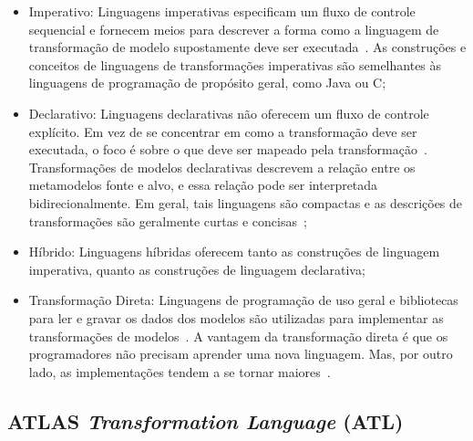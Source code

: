 \begin{itemize}
	\item Imperativo: Linguagens imperativas especificam um fluxo de controle sequencial e fornecem meios para descrever a forma como a linguagem de transformação de modelo supostamente deve ser executada~\cite{Mens_2006}. As construções e conceitos de linguagens de transformações imperativas são semelhantes às linguagens de programação de propósito geral, como Java ou C;
	\item Declarativo: Linguagens declarativas não oferecem um fluxo de controle explícito. Em vez de se concentrar em como a transformação deve ser executada, o foco é sobre o que deve ser mapeado pela transformação~\cite{Mens_2006}. Transformações de modelos declarativas descrevem a relação entre os metamodelos fonte e alvo, e essa relação pode ser interpretada bidirecionalmente. Em geral, tais linguagens são compactas e as descrições de transformações são geralmente curtas e concisas~\cite{Biehl_2010, Mens_2006};
	\item Híbrido: Linguagens híbridas oferecem tanto as construções de linguagem imperativa, quanto as construções de linguagem declarativa;
	\item Transformação Direta: Linguagens de programação de uso geral e bibliotecas para ler e gravar os dados dos modelos são utilizadas para implementar as transformações de modelos~\cite{transformation_huber}. A vantagem da transformação direta é que os programadores não precisam aprender uma nova linguagem. Mas, por outro lado, as implementações tendem a se tornar maiores~\cite{Biehl_2010}.
\end{itemize}



\subsection{ATLAS \emph{Transformation Language} (ATL)} %
\label{sub:atl_transformation_language}


